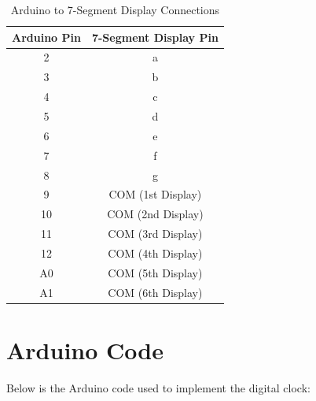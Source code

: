 \documentclass[journal]{IEEEtran}
\begin{document}
\begin{table}[htbp]
    \centering
    \renewcommand{\arraystretch}{1.2} %
    \caption{Arduino to 7-Segment Display Connections}
    \label{tab:connections}
    \begin{tabular}{cc}
        \toprule
        \textbf{Arduino Pin} & \textbf{7-Segment Display Pin} \\
        \midrule
        2  & a  \\
        3  & b  \\
        4  & c  \\
        5  & d  \\
        6  & e  \\
        7  & f  \\
        8  & g  \\
        \midrule
        9  & COM (1st Display)  \\
        10 & COM (2nd Display)  \\
        11 & COM (3rd Display)  \\
        12 & COM (4th Display)  \\
        A0 & COM (5th Display)  \\
        A1 & COM (6th Display)  \\
        \bottomrule
    \end{tabular}
\end{table}

\section{Arduino Code}
Below is the Arduino code used to implement the digital clock:
\end{document}
